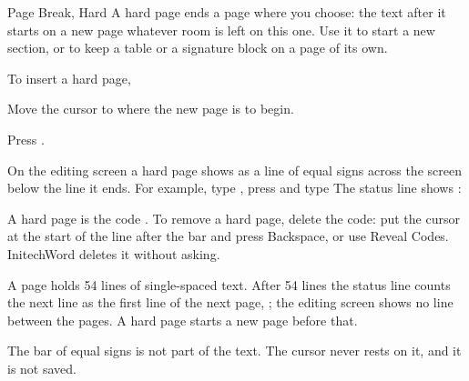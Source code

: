 \begin{Feature}{Page Break, Hard}
A hard page ends a page where you choose: the text after it starts on a new
page whatever room is left on this one.  Use it to start a new section, or
to keep a table or a signature block on a page of its own.

To insert a hard page,
\begin{WPSteps}
\item Move the cursor to where the new page is to begin.
\item Press .
\end{WPSteps}

On the editing screen a hard page shows as a line of equal signs across
the screen below the line it ends.  For example, type
, press  and type
  The status line shows :
\EndReplay

\Notes
{}
A hard page is the code \Code{[HPg]}.  To remove a hard page, delete the
code: put the cursor at the start of the line after the bar and press
Backspace, or use Reveal Codes.  InitechWord deletes it without asking.

A page holds 54 lines of single-spaced text.  After 54 lines the status line
counts the next line as the first line of the next page, ; the
editing screen shows no line between the pages.  A hard page starts a new
page before that.

The bar of equal signs is not part of the text.  The cursor never rests on
it, and it is not saved.

\end{Feature}

